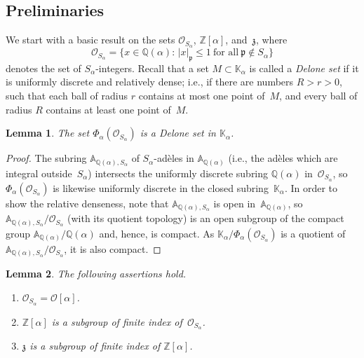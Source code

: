 \documentclass[12pt]{amsart}
\newtheorem{lemma}{Lemma}[section]
\theoremstyle{definition}
\theoremstyle{remark}
\numberwithin{equation}{section}
\begin{document}
\subsection*{Preliminaries}
We start with a basic result on the sets $\mathcal{O}_{S_\alpha}$, $\mathbb{Z}[\alpha]$, and~$\mathfrak{z}$, where
\[
\mathcal{O}_{S_\alpha} = \{x \in \mathbb{Q}(\alpha):\, |x|_{\mathfrak{p}} \le 1\ \mbox{for all}\ \mathfrak{p} \not\in S_\alpha\}
\]
denotes the set of $S_\alpha$-integers.
Recall that a set $M \subset \mathbb{K}_\alpha$ is called a \emph{Delone set} if it is uniformly discrete and relatively dense; i.e., if there are numbers $R>r>0$, such that each ball of radius $r$ contains at most one point of~$M$, and every ball of radius $R$ contains at least one point of~$M$.

\begin{lemma}\label{delonelemma}
The set $\Phi_\alpha(\mathcal{O}_{S_\alpha})$ is a Delone set in $\mathbb{K}_\alpha$.
\end{lemma}

\begin{proof}
The subring $\mathbb{A}_{\mathbb{Q}(\alpha),S_\alpha}$ of $S_\alpha$-ad\`eles in $\mathbb{A}_{\mathbb{Q}(\alpha)}$ (i.e., the ad\`eles which are integral outside~$S_\alpha$) intersects the uniformly discrete subring $\mathbb{Q}(\alpha)$ in~$\mathcal{O}_{S_\alpha}$, so $\Phi_\alpha(\mathcal{O}_{S_\alpha})$ is likewise uniformly discrete in the closed subring~$\mathbb{K}_\alpha$.
In order to show the relative denseness, note that $\mathbb{A}_{\mathbb{Q}(\alpha),S_\alpha}$ is open in~$\mathbb{A}_{\mathbb{Q}(\alpha)}$, so $\mathbb{A}_{\mathbb{Q}(\alpha),S_\alpha}/\mathcal{O}_{S_\alpha}$ (with its quotient topology) is an open subgroup of the compact group $\mathbb{A}_{\mathbb{Q}(\alpha)}/\mathbb{Q}(\alpha)$ and, hence, is compact.
As $\mathbb{K}_\alpha/\Phi_\alpha(\mathcal{O}_{S_\alpha})$ is a quotient of $\mathbb{A}_{\mathbb{Q}(\alpha),S_\alpha}/\mathcal{O}_{S_\alpha}$, it is also compact.
\end{proof}

\begin{lemma} \label{l:subgroup}
The following assertions hold.

\begin{enumerate}
\item \label{OSalpha}
$\mathcal{O}_{S_\alpha} = \mathcal{O}[\alpha]$.
\item \label{Zalphasubroup}
$\mathbb{Z}[\alpha]$ is a subgroup of finite index of~$\mathcal{O}_{S_\alpha}$.
\item \label{zsubgroup}
$\mathfrak{z}$ is a subgroup of finite index of $\mathbb{Z}[\alpha]$.
\end{enumerate}
\end{lemma}
\end{document}
